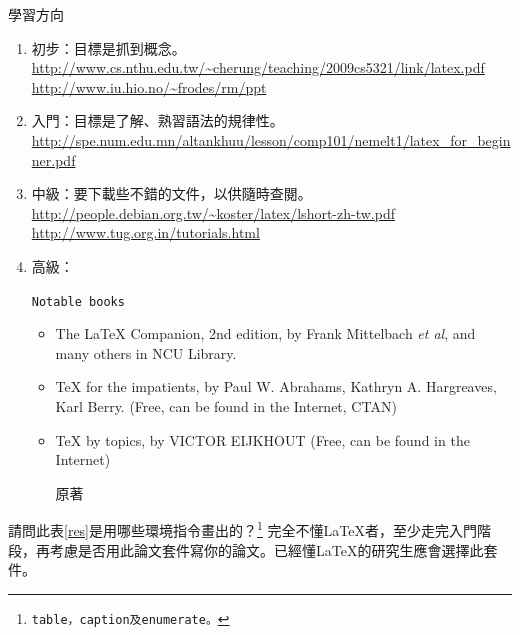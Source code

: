 \begin{table}[hbt!]
\caption{學習方向}
\begin{enumerate}
\item{\color{blue} 初步：目標是抓到概念。}\\
\url{http://www.cs.nthu.edu.tw/~cherung/teaching/2009cs5321/link/latex.pdf}\\
\url{http://www.iu.hio.no/~frodes/rm/ppt}
\item{\color{cyan} 入門：目標是了解、熟習語法的規律性}。
\url{http://spe.num.edu.mn/altankhuu/lesson/comp101/nemelt1/latex_for_beginner.pdf}
\item{\color{yellow}
中級：要下載些不錯的文件，以供隨時查閱。}\\ 
\url{http://people.debian.org.tw/~koster/latex/lshort-zh-tw.pdf}\\
\url{http://www.tug.org.in/tutorials.html}
\item
高級：{\tt Notable books 
\begin{itemize}
\item The \LaTeX{ }Companion, 2nd edition, by  Frank Mittelbach {\it et al}, and many others in NCU Library.
\item TeX for the impatients, by Paul W. Abrahams, Kathryn A. Hargreaves, Karl Berry. (Free, can be found in the Internet, CTAN)
\item TeX by topics, by VICTOR EIJKHOUT (Free, can be found in the Internet)
\item [原著] \cite{knu84,lam94}
\end{itemize}}
\end{enumerate}
\label{res}
\end{table}%
請問此表\ref{res}是用哪些環境指令畫出的？\footnote{\tt table，caption及enumerate。}
完全不懂\LaTeX{}者，至少走完入門階段，再考慮是否用此論文套件寫你的論文。已經懂\LaTeX{}的研究生應會選擇此套件。

\vfil  {}
